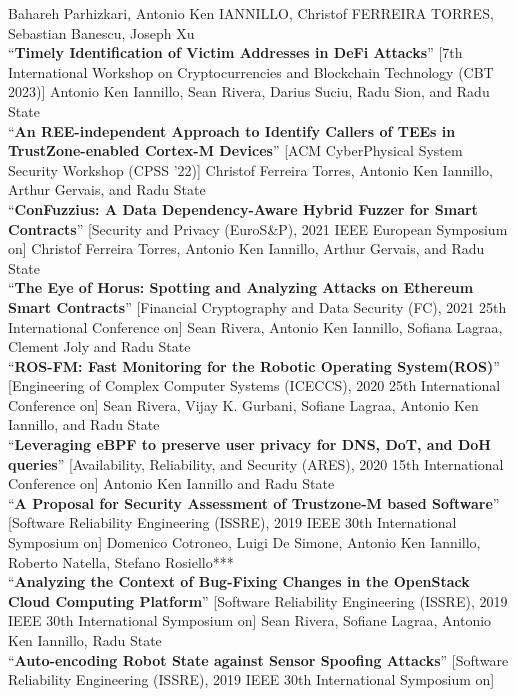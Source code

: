 \documentclass[margin,line]{resume}
\begin{document}
\begin{resume}
\filbreak
Bahareh Parhizkari, Antonio Ken IANNILLO, Christof FERREIRA TORRES, Sebastian Banescu, Joseph Xu\\
``\textbf{Timely Identification of Victim Addresses in DeFi Attacks}''
[7th International Workshop on Cryptocurrencies and Blockchain Technology (CBT 2023)]
\filbreak
Antonio Ken Iannillo, Sean Rivera, Darius Suciu, Radu Sion, and Radu State\\
``\textbf{An REE-independent Approach to Identify Callers of TEEs in TrustZone-enabled Cortex-M Devices}''
[ACM CyberPhysical System Security Workshop (CPSS ’22)]
\filbreak
Christof Ferreira Torres, Antonio Ken Iannillo, Arthur Gervais, and Radu State\\
``\textbf{ConFuzzius: A Data Dependency-Aware Hybrid Fuzzer for Smart Contracts}''
[Security and Privacy (EuroS\&P), 2021 IEEE European Symposium on]
\filbreak
Christof Ferreira Torres, Antonio Ken Iannillo, Arthur Gervais, and Radu State\\
``\textbf{The Eye of Horus: Spotting and Analyzing Attacks on Ethereum Smart Contracts}''
[Financial Cryptography and Data Security (FC), 2021 25th International Conference on]
\filbreak
Sean Rivera, Antonio Ken Iannillo, Sofiana Lagraa, Clement Joly and Radu State\\
``\textbf{ROS-FM: Fast Monitoring for the Robotic Operating System(ROS)}''
[Engineering of Complex Computer Systems (ICECCS), 2020 25th International Conference on]
\filbreak
Sean Rivera, Vijay K. Gurbani, Sofiane Lagraa, Antonio Ken Iannillo, and Radu State\\
``\textbf{Leveraging eBPF to preserve user privacy for DNS, DoT, and DoH queries}''
[Availability, Reliability, and Security (ARES), 2020 15th International Conference on]
\filbreak
Antonio Ken Iannillo and Radu State\\
``\textbf{A Proposal for Security Assessment of Trustzone-M based Software}''
[Software Reliability Engineering (ISSRE), 2019 IEEE 30th International Symposium on]
\filbreak
Domenico Cotroneo, Luigi De Simone, Antonio Ken Iannillo, Roberto Natella, Stefano Rosiello***\\
``\textbf{Analyzing the Context of Bug-Fixing Changes in the OpenStack Cloud Computing Platform}''
[Software Reliability Engineering (ISSRE), 2019 IEEE 30th International Symposium on]
\filbreak
Sean Rivera, Sofiane Lagraa, Antonio Ken Iannillo, Radu State\\
``\textbf{Auto-encoding Robot State against Sensor Spoofing Attacks}''
[Software Reliability Engineering (ISSRE), 2019 IEEE 30th International Symposium on]

\end{resume}
\end{document}
